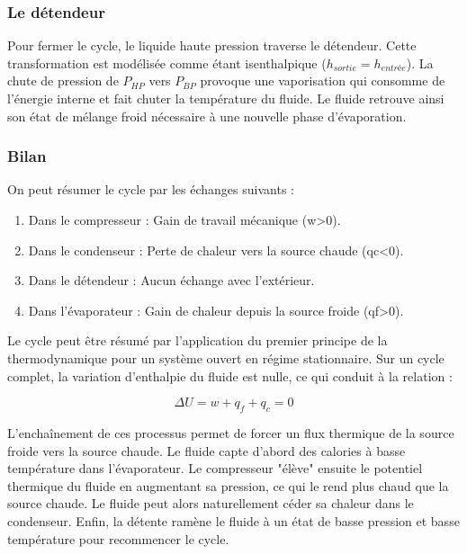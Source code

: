 \documentclass[a4paper,10pt,french]{scrartcl}
\begin{document}
\subsubsection{Le détendeur}
Pour fermer le cycle, le liquide haute pression traverse le détendeur. 
Cette transformation est modélisée comme étant isenthalpique ($h_{sortie} = h_{entrée}$). 
La chute de pression de $P_{HP}$ vers $P_{BP}$ provoque une vaporisation  qui consomme de l'énergie interne et fait chuter la température du fluide. 
Le fluide retrouve ainsi son état de mélange froid nécessaire à une nouvelle phase d'évaporation.

\subsubsection{Bilan}
On peut résumer le cycle par les échanges suivants :
\begin{enumerate}
\item {Dans le compresseur :} Gain de travail mécanique (w>0).
\item {Dans le condenseur :} Perte de chaleur vers la source chaude (qc<0).
\item {Dans le détendeur :} Aucun échange avec l'extérieur.
\item {Dans l'évaporateur :} Gain de chaleur depuis la source froide (qf>0).
\end{enumerate}

Le cycle peut être résumé par l'application du premier principe de la thermodynamique pour un système ouvert en régime stationnaire. 
Sur un cycle complet, la variation d'enthalpie du fluide est nulle, ce qui conduit à la relation :


$$\Delta U = w + q_f + q_c = 0$$

L'enchaînement de ces processus permet de forcer un flux thermique de la source froide vers la source chaude. Le fluide capte d'abord des calories à basse température dans l'évaporateur. Le compresseur "élève" ensuite le potentiel thermique du fluide en augmentant sa pression, ce qui le rend plus chaud que la source chaude. Le fluide peut alors naturellement céder sa chaleur dans le condenseur. Enfin, la détente ramène le fluide à un état de basse pression et basse température pour recommencer le cycle.

\end{document}
